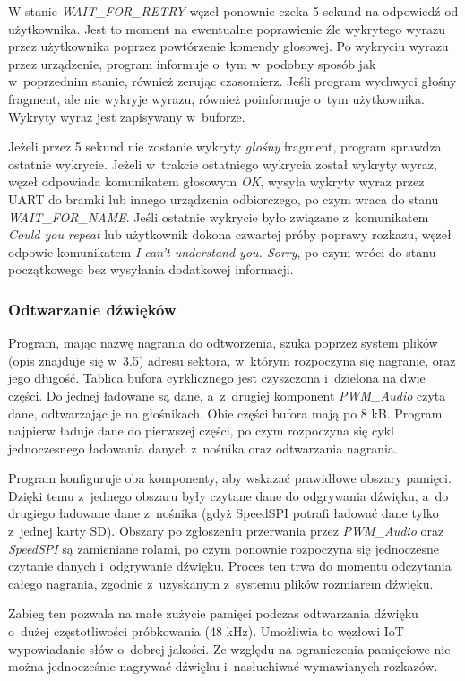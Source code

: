 W stanie \textit{WAIT\_FOR\_RETRY} węzeł ponownie czeka 5 sekund na odpowiedź od użytkownika. Jest to moment na ewentualne poprawienie źle wykrytego wyrazu przez użytkownika poprzez powtórzenie komendy głosowej. Po wykryciu wyrazu przez urządzenie, program informuje o~tym w~podobny sposób jak w~poprzednim stanie, również zerując czasomierz. Jeśli program wychwyci głośny fragment, ale nie wykryje wyrazu, również poinformuje o~tym użytkownika. Wykryty wyraz jest zapisywany w~buforze.

Jeżeli przez 5 sekund nie zostanie wykryty \textit{głośny} fragment, program sprawdza ostatnie wykrycie. Jeżeli w~trakcie ostatniego wykrycia został wykryty wyraz, węzeł odpowiada komunikatem głosowym \textit{OK}, wysyła wykryty wyraz przez UART do bramki lub innego urządzenia odbiorczego, po czym wraca do stanu \textit{WAIT\_FOR\_NAME}. Jeśli ostatnie wykrycie było związane z~komunikatem \textit{Could you repeat} lub użytkownik dokona czwartej próby poprawy rozkazu, węzeł odpowie komunikatem \textit{I can't understand you. Sorry}, po czym wróci do stanu początkowego bez wysyłania dodatkowej informacji.

\subsubsection{Odtwarzanie dźwięków}

Program, mając nazwę nagrania do odtworzenia, szuka poprzez system plików (opis znajduje się w~3.5) adresu sektora, w~którym rozpoczyna się nagranie, oraz jego długość. Tablica bufora cyrklicznego jest czyszczona i~dzielona na dwie części. Do jednej ładowane są dane, a~z~drugiej komponent \textit{PWM\_Audio} czyta dane, odtwarzając je na głośnikach. Obie części bufora mają po 8 kB. Program najpierw ładuje dane do pierwszej części, po czym rozpoczyna się cykl jednoczesnego ładowania danych z~nośnika oraz odtwarzania nagrania.

Program konfiguruje oba komponenty, aby wskazać prawidłowe obszary pamięci. Dzięki temu z~jednego obszaru były czytane dane do odgrywania dźwięku, a~do drugiego ładowane dane z~nośnika (gdyż SpeedSPI potrafi ładować dane tylko z~jednej karty SD). Obszary po zgłoszeniu przerwania przez \textit{PWM\_Audio} oraz \textit{SpeedSPI} są zamieniane rolami, po czym ponownie rozpoczyna się jednoczesne czytanie danych i~odgrywanie dźwięku. Proces ten trwa do momentu odczytania całego nagrania, zgodnie z~uzyskanym z~systemu plików rozmiarem dźwięku.

Zabieg ten pozwala na małe zużycie pamięci podczas odtwarzania dźwięku o~dużej częstotliwości próbkowania (48 kHz). Umożliwia to węzłowi IoT wypowiadanie słów o~dobrej jakości. Ze względu na ograniczenia pamięciowe nie można jednocześnie nagrywać dźwięku i~nasłuchiwać wymawianych rozkazów.

